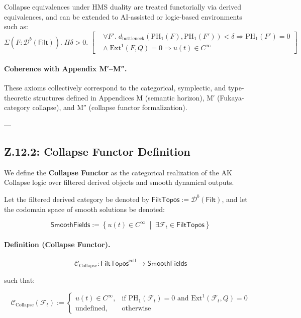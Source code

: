 \documentclass[11pt]{article}
\begin{document}
\begin{axiom}
\begin{axiom}
{{Collapse equivalences under HMS duality are treated functorially via derived equivalences,  
and can be extended to AI-assisted or logic-based environments such as:
\[
\Sigma \left( F : \mathcal{D}^b(\mathsf{Filt}) \right).\;
\Pi \delta > 0.\;
\left[
\begin{aligned}
  &\forall F'.\; d_{\text{bottleneck}}(\mathrm{PH}_1(F), \mathrm{PH}_1(F')) < \delta \Rightarrow \mathrm{PH}_1(F') = 0 \\
  &\land\; \mathrm{Ext}^1(F, Q) = 0 \Rightarrow u(t) \in C^\infty
\end{aligned}
\right]
\]

\paragraph{Coherence with Appendix M′–M″.}

These axioms collectively correspond to the categorical, symplectic, and type-theoretic structures  
defined in Appendices M (semantic horizon), M′ (Fukaya-category collapse), and M″ (collapse functor formalization).

---


\subsection*{Z.12.2: Collapse Functor Definition}

We define the \textbf{Collapse Functor} as the categorical realization of the AK Collapse logic  
over filtered derived objects and smooth dynamical outputs.

Let the filtered derived category be denoted by \( \mathsf{FiltTopos} := \mathcal{D}^b(\mathsf{Filt}) \),  
and let the codomain space of smooth solutions be denoted:

\[
\mathsf{SmoothFields} := \left\{ u(t) \in C^\infty \;\middle|\; \exists \mathcal{F}_t \in \mathsf{FiltTopos} \right\}
\]

\paragraph{Definition (Collapse Functor).}

\[
\mathcal{C}_{\text{Collapse}} : \mathsf{FiltTopos}^{\text{coll}} \longrightarrow \mathsf{SmoothFields}
\]

such that:

\[
\mathcal{C}_{\text{Collapse}}(\mathcal{F}_t) := 
\begin{cases}
u(t) \in C^\infty, & \text{if } \mathrm{PH}_1(\mathcal{F}_t) = 0 \text{ and } \mathrm{Ext}^1(\mathcal{F}_t, Q) = 0 \\
\text{undefined}, & \text{otherwise}
\end{cases}
\]

}}
\end{axiom}
\end{axiom}
\end{document}
